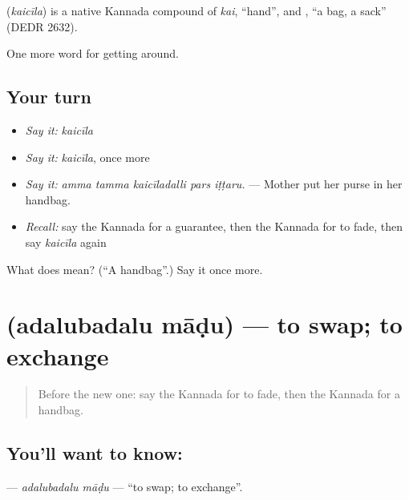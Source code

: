 \begin{cousinweb}
\textbf{} (\emph{kaicīla}) is a native Kannada compound of \emph{kai}, \textquotedblleft{}hand\textquotedblright{}, and , \textquotedblleft{}a bag, a sack\textquotedblright{} (DEDR 2632).
\end{cousinweb}

\begin{grammarlens}[title={What you've built}]
One more word for getting around.
\end{grammarlens}

\subsection*{Your turn}
\begin{itemize}
\raggedright
  \item \emph{Say it:} \emph{kaicīla}
  \item \emph{Say it:} \emph{kaicīla}, once more
  \item \emph{Say it:} \emph{amma tamma kaicīladalli pars iṭṭaru.} — Mother put her purse in her handbag.
  \item \emph{Recall:} say the Kannada for a guarantee, then the Kannada for to fade, then say \emph{kaicīla} again
\end{itemize}

\begin{tcolorbox}[breakable,colback=teal!4,colframe=teal!35!black,title={Before you move on}]
What does  mean? (\textquotedblleft{}A handbag\textquotedblright{}.) Say it once more.
\end{tcolorbox}
\section[\texorpdfstring{\kn{ಅದಲುಬದಲು} \kn{ಮಾಡು} (adalubadalu māḍu)}{ಅದಲುಬದಲು ಮಾಡು (adalubadalu māḍu)}]{  (adalubadalu māḍu) — to swap; to exchange}

\label{lesson:KA-C469-adalubadalu-madu}



\begin{quote}
Before the new one: say the Kannada for to fade, then the Kannada for a handbag.
\end{quote}

\subsection*{You'll want to know:  }
\textbf{ } — \emph{adalubadalu māḍu} — \textquotedblleft{}to swap; to exchange\textquotedblright{}.

